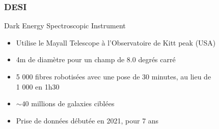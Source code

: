 \documentclass{beamer}
\begin{document}
\subsubsection{DESI}

\begin{frame}{Dark Energy Spectroscopic Instrument}
\begin{itemize}
	\item Utilise le Mayall Telescope à l'Observatoire de Kitt peak (USA)
	\item 4m de diamètre pour un champ de 8.0 degrés carré
	\item 5 000 fibres robotisées avec une pose de 30 minutes, au lieu de \\1 000 en 1h30
	\item $\sim 40$ millions de galaxies ciblées
	\item Prise de données débutée en 2021, pour 7 ans
\end{itemize}


\end{frame}
\end{document}
